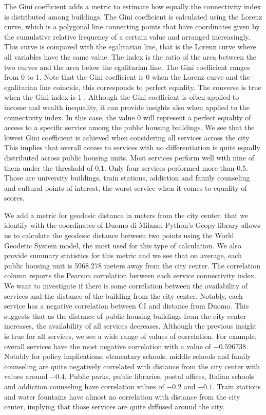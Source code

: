 \documentclass[12pt]{article}
\begin{document}
The Gini coefficient adds a metric to estimate how equally the connectivity index is distributed among buildings. The Gini coefficient is calculated using the Lorenz curve, which is a polygonal line connecting points that have coordinates given by the cumulative relative frequency of a certain value and arranged increasingly. This curve is compared with the egalitarian line, that is the Lorenz curve where all variables have the same value. The index is the ratio of the area between the two curves and the area below the egalitarian line. The Gini coefficient ranges from 0 to 1. Note that the Gini coefficient is 0 when the Lorenz curve and the egalitarian line coincide, this corresponds to perfect equality. The converse is true when the Gini index is 1 \parencite{giorgi_gini_2020}. Although the Gini coefficient is often applied to income and wealth inequality, it can provide insights also when applied to the connectivity index. In this case, the value 0 will represent a perfect equality of access to a specific service among the public housing buildings. We see that the lowest Gini coefficient is achieved when considering all services across the city. This implies that overall access to services with no differentiation is quite equally distributed across public housing units. Most services perform well with nine of them under the threshold of $0.1$. Only four services performed more than $0.5$. Those are university buildings, train stations, addiction and family counseling and cultural points of interest, the worst service when it comes to equality of scores. 


We add a metric for geodesic distance in meters from the city center, that we identify with the coordinates of Duomo di Milano. Python's Geopy library allows us to calculate the geodesic distance between two points using the World Geodetic System model, the most used for this type of calculation. We also provide summary statistics for this metric and we see that on average, each public housing unit is 5968.278 meters away from the city center. The correlation column reports the Pearson correlation between each service connectivity index. We want to investigate if there is some correlation between the availability of services and the distance of the building from the city center. Notably, each service has a negative correlation between CI and distance from Duomo. This suggests that as the distance of public housing buildings from the city center increases, the availability of all services decreases. Although the previous insight is true for all services, we see a wide range of values of correlation. For example, overall services have the most negative correlation with a value of $-0.596738$. Notably for policy implications, elementary schools, middle schools and family counseling are quite negatively correlated with distance from the city center with values around $-0.4$. Public parks, public libraries, postal offices, Italian schools
and addiction counseling have correlation values of $-0.2$ and $-0.1$. Train stations and water fountains have almost no correlation with distance from the city center, implying that those services are quite diffused around the city. 
\end{document}
